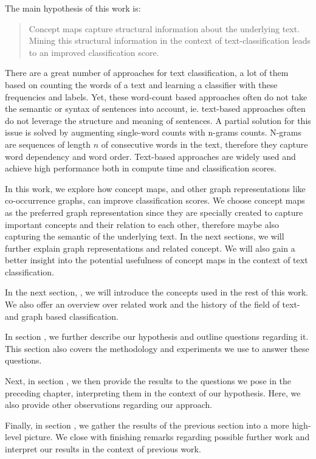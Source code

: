 The main hypothesis of this work is:
\begin{quote}
Concept maps capture structural information about the underlying text. Mining this structural information in the context of text-classification leads to an improved classification score.
\end{quote}

There are a great number of approaches for text classification, a lot of them based on counting the words of a text and learning a classifier with these frequencies and labels.
Yet, these word-count based approaches often do not take the semantic or syntax of sentences into account, ie. text-based approaches often do not leverage the structure and meaning of sentences.
A partial solution for this issue is solved by augmenting single-word counts with n-grams counts.
N-grams are sequences of length $n$ of consecutive words in the text, therefore they capture word dependency and word order.
Text-based approaches are widely used and achieve high performance both in compute time and classification scores.

In this work, we explore how concept maps, and other graph representations like co-occurrence graphs, can improve classification scores.
We choose concept maps as the preferred graph representation since they are specially created to capture important concepts and their relation to each other, therefore maybe also capturing the semantic of the underlying text.
In the next sections, we will further explain graph representations and related concept. 
We will also gain a better insight into the potential usefulness of concept maps in the context of text classification.


In the next section, , we will introduce the concepts used in the rest of this work.
We also offer an overview over related work and the history of the field of text- and graph based classification.

In section , we further describe our hypothesis and outline questions regarding it. This section also covers the methodology and experiments we use to answer these questions.

Next, in section , we then provide the results to the questions we pose in the preceding chapter, interpreting them in the context of our hypothesis.
Here, we also provide other observations regarding our approach.

Finally, in section , we gather the results of the previous section into a more high-level picture.
We close with finishing remarks regarding possible further work and interpret our results in the context of previous work.